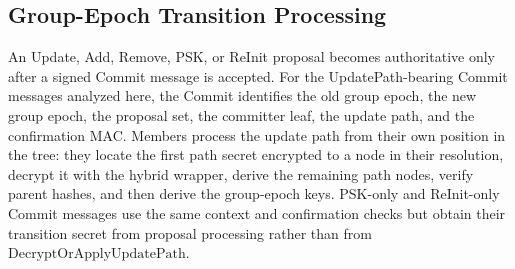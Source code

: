 \documentclass[preprint,12pt]{elsarticle}
\theoremstyle{definition}
\begin{document}
\subsection{Group-Epoch Transition Processing}

An Update, Add, Remove, PSK, or ReInit proposal becomes authoritative only
after a signed Commit message is accepted. For the UpdatePath-bearing Commit
messages analyzed here, the Commit identifies the old group epoch, the new group
epoch, the proposal set, the committer leaf, the update path, and the
confirmation MAC. Members process the update path from their own position in the
tree: they locate the first path secret encrypted to a node in their resolution,
decrypt it with the hybrid wrapper, derive the remaining path nodes, verify
parent hashes, and then derive the group-epoch keys. PSK-only and ReInit-only
Commit messages use the same context and confirmation checks but obtain their
transition secret from proposal processing rather than from
$\mathrm{DecryptOrApplyUpdatePath}$.
\end{document}
